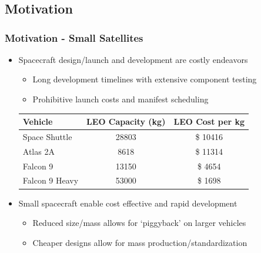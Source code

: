 
\section*{}
\subsection*{Motivation}  

\begin{frame} %
\frametitle{Motivation - Small Satellites} %
    \begin{itemize}
        \item Spacecraft design/launch and development are costly endeavors
            \begin{itemize}
                \item Long development timelines with extensive component testing
                \item Prohibitive launch costs and manifest scheduling
            \end{itemize}
            \pause
        \begin{table}
        \begin{tabular}{l | c | c }
            Vehicle & LEO Capacity (\si{\kilogram}) & LEO Cost per \si{\kilogram} \\
            \hline \hline
            Space Shuttle & \num{28803} & \$ \num{10416}  \\ 
            Atlas 2A & \num{8618} & \$ \num{11314} \\
            Falcon 9 & \num{13150} & \$ \num{4654} \\
            Falcon 9 Heavy & \num{53000} & \$ \num{1698}
        \end{tabular}
        \end{table}
        \item Small spacecraft enable cost effective and rapid development
    
            \begin{itemize}
                \item Reduced size/mass allows for `piggyback' on larger vehicles
                \item Cheaper designs allow for mass production/standardization 
            \end{itemize}

    \end{itemize}
    
\end{frame}   %

